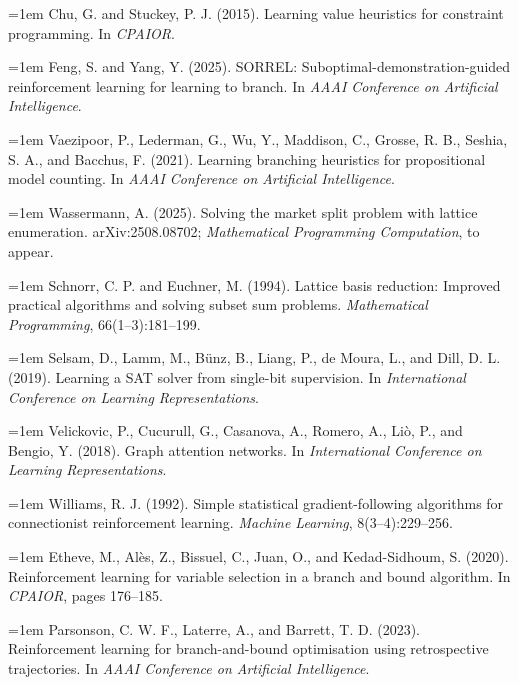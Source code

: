 \documentclass[final,5p,twocolumn]{elsarticle}
\begin{document}
{\noindent\hangindent=1em Chu, G. and Stuckey, P. J. (2015). Learning value heuristics for constraint programming. In \textit{CPAIOR}.\par\smallskip
\noindent\hangindent=1em Feng, S. and Yang, Y. (2025). SORREL: Suboptimal-demonstration-guided reinforcement learning for learning to branch. In \textit{AAAI Conference on Artificial Intelligence}.\par\smallskip
\noindent\hangindent=1em Vaezipoor, P., Lederman, G., Wu, Y., Maddison, C., Grosse, R. B., Seshia, S. A., and Bacchus, F. (2021). Learning branching heuristics for propositional model counting. In \textit{AAAI Conference on Artificial Intelligence}.\par\smallskip
\noindent\hangindent=1em Wassermann, A. (2025). Solving the market split problem with lattice enumeration. arXiv:2508.08702; \textit{Mathematical Programming Computation}, to appear.\par\smallskip
\noindent\hangindent=1em Schnorr, C. P. and Euchner, M. (1994). Lattice basis reduction: Improved practical algorithms and solving subset sum problems. \textit{Mathematical Programming}, 66(1–3):181–199.\par\smallskip
\noindent\hangindent=1em Selsam, D., Lamm, M., Bünz, B., Liang, P., de Moura, L., and Dill, D. L. (2019). Learning a SAT solver from single-bit supervision. In \textit{International Conference on Learning Representations}.\par\smallskip
\noindent\hangindent=1em Velickovic, P., Cucurull, G., Casanova, A., Romero, A., Liò, P., and Bengio, Y. (2018). Graph attention networks. In \textit{International Conference on Learning Representations}.\par\smallskip
\noindent\hangindent=1em Williams, R. J. (1992). Simple statistical gradient-following algorithms for connectionist reinforcement learning. \textit{Machine Learning}, 8(3–4):229–256.\par\smallskip
\noindent\hangindent=1em Etheve, M., Alès, Z., Bissuel, C., Juan, O., and Kedad-Sidhoum, S. (2020). Reinforcement learning for variable selection in a branch and bound algorithm. In \textit{CPAIOR}, pages 176–185.\par\smallskip
\noindent\hangindent=1em Parsonson, C. W. F., Laterre, A., and Barrett, T. D. (2023). Reinforcement learning for branch-and-bound optimisation using retrospective trajectories. In \textit{AAAI Conference on Artificial Intelligence}.\par\smallskip
}
\end{document}
